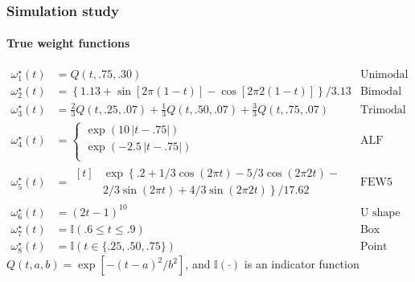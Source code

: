 \documentclass{snedecorbeamer}
\begin{document}
\begin{frame}
  \frametitle{Simulation study}
  \framesubtitle{True weight functions}

  \vspace{-2ex}
  {\small
    \begin{align*}
      \omega^\star_1(t)
      &=Q(t, .75, .30)
      &\text{Unimodal} \\
      \omega^\star_2(t)
      &=\left\{1.13 + \sin[2\pi(1-t)] - \cos[2\pi2(1-t)]\right\} / 3.13
      &\text{Bimodal} \\
      \omega^\star_3(t)
      &=\frac{2}{3} Q(t, .25, .07)+
        \frac{1}{3} Q(t, .50, .07) +
        \frac{3}{3} Q(t, .75, .07)
      &\text{Trimodal} \\
      \omega^\star_4(t)
      &=
        \begin{cases}
          \exp\left(10\,\lvert t - .75 \rvert\right) \\
          \exp\left(-2.5\,\lvert t - .75 \rvert\right) \\
        \end{cases}
      &\text{ALF} \\
      \omega^\star_5(t)
      &=
        \begin{aligned}[t]
          &\exp\left\{\right.
          .2 +
          1/3 \cos(2\pi t) - 5/3 \cos(2\pi2t) - \\
          &2/3 \sin(2\pi t) + 4/3 \sin(2\pi2t)
          \left.\right\} / 17.62
        \end{aligned}
      &\text{FEW5} \\
      \omega^\star_6(t)
      &= {(2t - 1)}^{10}
      &\text{U shape} \\
      \omega^\star_7(t)
      &=\mathbb{I}(.6\le t \le.9)
      &\text{Box} \\
      \omega^\star_8(t)
      &=\mathbb{I}(t\in\{.25, .50, .75\})
      &\text{Point mass}
    \end{align*}
    $Q(t, a, b) = \exp\left[-{(t - a)}^2/b^2\right]$, and $\mathbb{I}(\cdot)$
    is an indicator function}
\end{frame}
\end{document}
